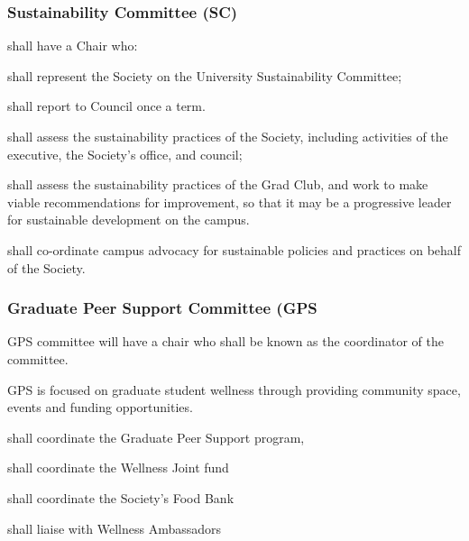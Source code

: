 \subsubsection{Sustainability Committee (SC)}
\begin{longenum}[ label*=\thesubsubsection.\arabic*., align=left]
    \item shall have a Chair who:
    \begin{longenum}[ label*=\arabic*., align=left]
		\item shall represent the Society on the University Sustainability Committee;
        \item shall report to Council once a term.
	\end{longenum}
    \item shall assess the sustainability practices of the Society, including activities of the executive, the Society's office, and council;
    \item shall assess the sustainability practices of the Grad Club, and work to make viable recommendations for improvement, so that it  may be a progressive leader for sustainable development  on the campus. 
    \item shall co-ordinate campus advocacy for sustainable policies and practices on behalf of the Society.
\end{longenum}

\subsubsection{Graduate Peer Support Committee (GPS}
\begin{longenum}[ label*=\thesubsubsection.\arabic*., align=left]
	\item GPS committee will have a chair who shall be known as the coordinator of the committee.
	\item  GPS is focused on graduate student wellness through providing community space, events and funding opportunities.
 \begin{longenum}[ label*=\arabic*., align=left]
\item shall coordinate the Graduate Peer Support program,
\item shall coordinate the Wellness Joint fund
\item shall coordinate the Society's Food Bank
\item shall liaise with Wellness Ambassadors
\end{longenum}

\end{longenum}

